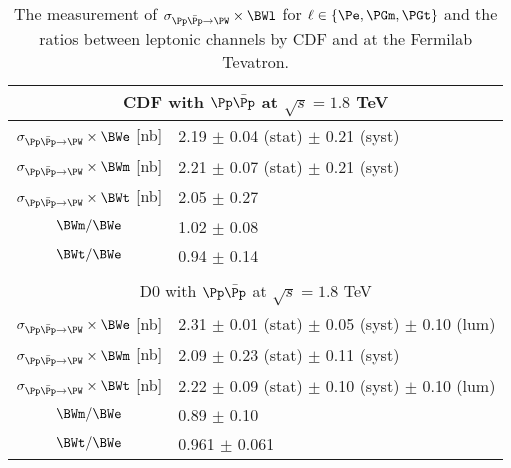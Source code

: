 \begin{table}[ht]
    \setlength{\tabcolsep}{0.5 em}
    \renewcommand{\arraystretch}{1.5}
    \centering
    \caption{The measurement of $\sigma_{\Pp \bar{\Pp} \to \PW} \times \BWl$ for $\ell \in \{ \Pe, \PGm, \PGt\}$ and the ratios between leptonic channels by CDF and \DZERO at the Fermilab Tevatron.}
    \begin{tabular}{ |c|l| } 
         

         
         \hline
         \multicolumn{2}{|c|}{CDF with $\Pp \bar{\Pp}$ at $\sqrt{s}=1.8$ TeV} \\
         \hline
         $\sigma_{\Pp \bar{\Pp} \to \PW} \times \BWe$  [nb] \cite{Abe:1990sd}    & 2.19 $\pm$ 0.04 (stat) $\pm$ 0.21 (syst) \\ 
         $\sigma_{\Pp \bar{\Pp} \to \PW} \times \BWm$  [nb] \cite{Abe:1992ys}    & 2.21 $\pm$ 0.07 (stat) $\pm$ 0.21 (syst) \\ 
         $\sigma_{\Pp \bar{\Pp} \to \PW} \times \BWt$  [nb] \cite{Abe:1991fb}    & 2.05 $\pm$ 0.27 \\ 
         \hline
         $\BWm / \BWe$ \cite{Abe:1992ys} & 1.02  $\pm$ 0.08 \\
         $\BWt / \BWe$ \cite{Abe:1991fb} & 0.94  $\pm$ 0.14 \\

         \hline
         
         \multicolumn{2}{c}{}  \\
         
         \hline
         \multicolumn{2}{|c|}{D0 with $\Pp \bar{\Pp}$ at $\sqrt{s}=1.8$ TeV} \\
         \hline
         $\sigma_{\Pp \bar{\Pp} \to \PW} \times \BWe$  [nb] \cite{Abbott:1999tt} & 2.31 $\pm$ 0.01 (stat) $\pm$ 0.05 (syst) $\pm$ 0.10 (lum) \\ 
         $\sigma_{\Pp \bar{\Pp} \to \PW} \times \BWm$  [nb] \cite{Abachi:1995xc} & 2.09 $\pm$ 0.23 (stat) $\pm$ 0.11 (syst) \\ 
         $\sigma_{\Pp \bar{\Pp} \to \PW} \times \BWt$  [nb] \cite{Abbott:1999pk} & 2.22 $\pm$ 0.09 (stat) $\pm$ 0.10 (syst) $\pm$ 0.10 (lum)  \\ 
         \hline
         $\BWm / \BWe$ \cite{Abachi:1995xc} & 0.89  $\pm$ 0.10 \\
         $\BWt / \BWe$ \cite{Abbott:1999pk} & 0.961 $\pm$ 0.061 \\
         
         \hline
         
         
    \end{tabular}
    \label{tab:introduction:relatedWorks:tevatron}
\end{table}
